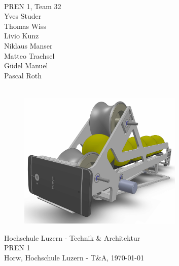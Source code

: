 \begin{titlepage}
    \begin{center}
        \parindent0pt{\Huge\bfseries \myDokumentTyp}\\[0.5cm]
        {\huge PREN 1, Team 32}\\[1cm]
        Yves Studer\\
        Thomas Wiss\\
        Livio Kunz\\
        Niklaus Manser\\
        Matteo Trachsel\\
        Güdel Manuel\\
        Pascal Roth\\
        \vspace*{1cm}
        {\Huge \myTitel}\\[0.5cm]
        \begin{figure}[h!]
            \centering
            \includegraphics[width=0.7\textwidth]{Enddokumentation/Titelbild.JPG}
        \end{figure}
        
        \vfill{}
        {\normalsize Hochschule Luzern - Technik \& Architektur\\
         PREN 1}\\[0.6cm]
        {\normalsize Horw, Hochschule Luzern - T\&A, \today}
    \end{center}
\end{titlepage}
